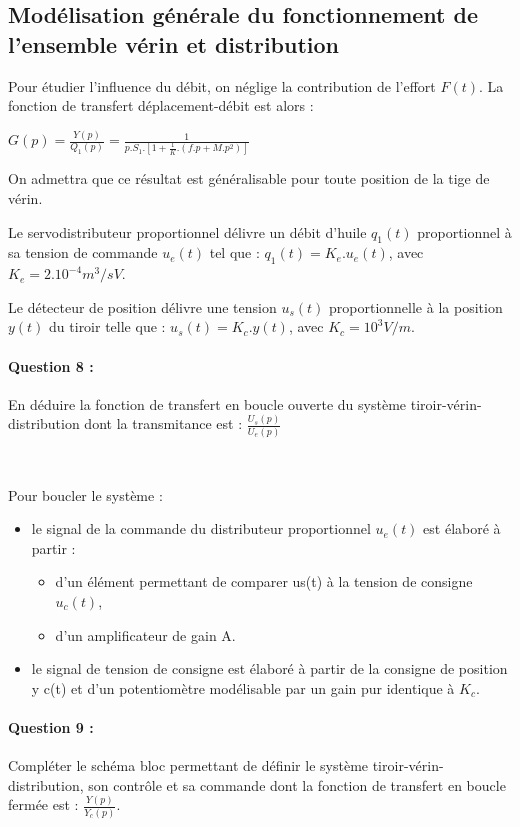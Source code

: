\subsection{Modélisation générale du fonctionnement de l'ensemble vérin et distribution}

Pour étudier l'influence du débit, on néglige la contribution de l'effort $F(t)$. La fonction de transfert déplacement-débit est alors :

$G(p)=\frac{Y(p)}{Q_1(p)}=\frac{1}{p.S_1.\left[1+\frac{1}{K}.(f.p+M.p^2)\right]}$

On admettra que ce résultat est généralisable pour toute position de la tige de vérin.

Le servodistributeur proportionnel délivre un débit d'huile $q_1(t)$ proportionnel à sa tension de commande $u_e(t)$ tel que : $q_1(t)=K_e.u_e(t)$, avec $K_e=2.10^{-4}m^3/sV$.

Le détecteur de position délivre une tension $u_s(t)$ proportionnelle à la position $y(t)$ du tiroir telle que : $u_s(t)=K_c.y(t)$, avec $K_c=10^3V/m$.

\paragraph{Question 8 :} En déduire la fonction de transfert en boucle ouverte du système tiroir-vérin-distribution dont la transmitance est : $\frac{U_s(p)}{U_e(p)}$

~\

Pour boucler le système :
\begin{itemize}
 \item le signal de la commande du distributeur proportionnel $u_e(t)$ est élaboré à partir :
 \begin{itemize}
  \item d'un élément permettant de comparer us(t) à la tension de consigne $u_c(t)$,
  \item d'un amplificateur de gain A.
 \end{itemize}
 \item le signal de tension de consigne est élaboré à partir de la consigne de position y c(t) et d'un potentiomètre modélisable par un gain pur identique à $K_c$.
\end{itemize}

\paragraph{Question 9 :} Compléter le schéma bloc permettant de définir le système tiroir-vérin-distribution, son contrôle et sa commande dont la fonction de transfert en boucle fermée est : $\frac{Y(p)}{Y_c(p)}$.

